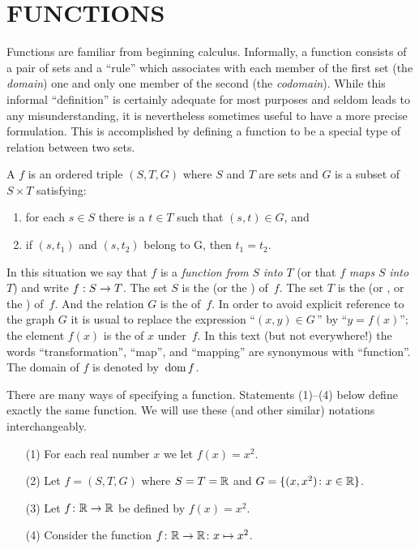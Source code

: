 \section{FUNCTIONS} Functions are familiar from beginning calculus. Informally, a function
consists of a pair of sets and a ``rule'' which associates with each member of the first set
(the \emph{domain}) one and only one member of the second (the \emph{codomain}).  While this
informal ``definition'' is certainly adequate for most purposes and seldom leads to any
misunderstanding, it is nevertheless sometimes useful to have a more precise formulation.
This is accomplished by defining a function to be a special type of relation between two sets.

\begin{defn} A
 $f$ is an ordered triple $(S,T,G)$ where $S$ and $T$ are sets and $G$ is a
subset of $S \times T$ satisfying:
 \begin{enumerate}
   \item for each $s \in S$ there is a $t \in T$ such that $(s,t) \in G$, and
   \item if $(s,t_1)$ and $(s,t_2)$ belong to G, then $t_1 = t_2$.
 \end{enumerate}
In this situation we say that $f$ is a \emph{function from} $S$ \emph{into} $T$ (or that $f$
\emph{maps} $S$ \emph{into} $T$) and write $f: S \rightarrow T$.  The set $S$ is the
 (or the
) of~$f$.  The set $T$ is the
 (or
, or the
) of~$f$.  And the relation $G$ is the
 of~$f$.  In order to avoid explicit reference to the graph $G$ it is usual to
replace the expression ``$(x,y) \in G\,$'' by ``$y = f(x)$''; the element $f(x)$ is the
 of $x$ under~$f$. In this text (but not everywhere!) the words
``transformation'',
``map'', and
``mapping'' are synonymous with ``function''.  The domain of $f$ is denoted
by~$\operatorname{dom} f$.
\end{defn}

\begin{exam} There are many ways of specifying a function.  Statements (1)--(4) below define
exactly the same function.  We will use these (and other similar) notations interchangeably.
 \begin{enumerate}
   \item[(1)] For each real number $x$ we let $f(x) =x^2$.
   \item[(2)] Let $f = (S,T,G)$ where $S = T = \mathbb{R}$ and $G = \{(x,x^2) \colon x \in \mathbb{R}\}$.
   \item[(3)] Let $f\colon \mathbb{R} \rightarrow \mathbb{R}$ be defined by $f(x) = x^2$.
   \item[(4)] Consider the function
$f\colon \mathbb{R} \rightarrow \mathbb{R}\colon  x \mapsto x^2$.
 \end{enumerate}
\end{exam}


